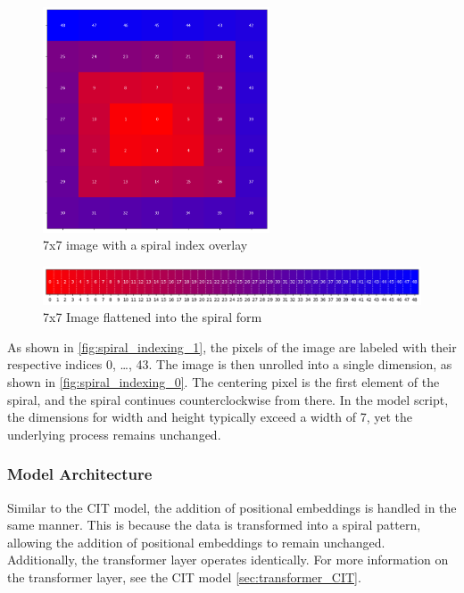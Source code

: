    
    \begin{figure}[H]
    \centering
    \includegraphics[width=0.6\textwidth]{../code/dataAnalysis/plots/exampleImgs/spiralShowcase1.png}
    \caption{7x7 image with a spiral index overlay}
    \label{fig:spiral_indexing_1}        
    \end{figure}

    \begin{figure}[H]
    \centering
    \includegraphics[width=1\textwidth]{../code/dataAnalysis/plots/exampleImgs/spiralShowcase0.png}
    \caption{7x7 Image flattened into the spiral form} 
    \label{fig:spiral_indexing_0}        
    \end{figure}

    As shown in \autoref{fig:spiral_indexing_1}, the pixels of the image are labeled with their respective indices 0, \dots, 43. The image is then unrolled into a single dimension, as shown in \autoref{fig:spiral_indexing_0}. The centering pixel is the first element of the spiral, and the spiral continues counterclockwise from there. In the model script, the dimensions for width and height typically exceed a width of 7, yet the underlying process remains unchanged.



\subsubsection{Model Architecture}

Similar to the CIT model, the addition of positional embeddings is handled in the same manner. This is because the data is transformed into a spiral pattern, allowing the addition of positional embeddings to remain unchanged. Additionally, the transformer layer operates identically. For more information on the transformer layer, see the CIT model \autoref{sec:transformer_CIT}.


